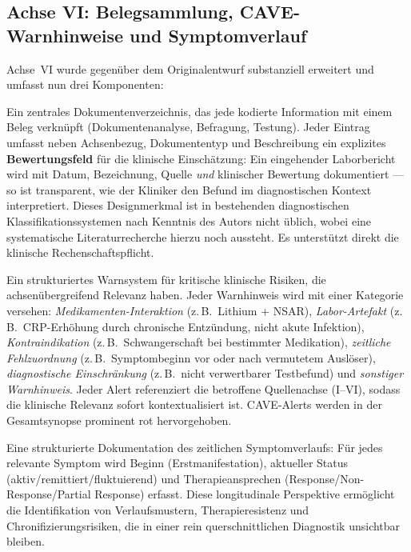 \documentclass[11pt,a4paper]{article}
\begin{document}
\subsection{Achse VI: Belegsammlung, CAVE-Warnhinweise und Symptomverlauf}

Achse~VI wurde gegen\"uber dem Originalentwurf substanziell erweitert und umfasst nun drei Komponenten:

\begin{description}[style=nextline, leftmargin=1.5cm, font=\bfseries]
\item[Evidenz-Matrix] Ein zentrales Dokumentenverzeichnis, das jede kodierte Information mit einem Beleg verkn\"upft (Dokumentenanalyse, Befragung, Testung). Jeder Eintrag umfasst neben Achsenbezug, Dokumententyp und Beschreibung ein explizites \textbf{Bewertungsfeld} f\"ur die klinische Einsch\"atzung: Ein eingehender Laborbericht wird mit Datum, Bezeichnung, Quelle \textit{und} klinischer Bewertung dokumentiert --- so ist transparent, wie der Kliniker den Befund im diagnostischen Kontext interpretiert. Dieses Designmerkmal ist in bestehenden diagnostischen Klassifikationssystemen nach Kenntnis des Autors nicht \"ublich, wobei eine systematische Literaturrecherche hierzu noch aussteht. Es unterst\"utzt direkt die klinische Rechenschaftspflicht.
\item[CAVE-Warnhinweise] Ein strukturiertes Warnsystem f\"ur kritische klinische Risiken, die achsen\"ubergreifend Relevanz haben. Jeder Warnhinweis wird mit einer Kategorie versehen: \textit{Medikamenten-Interaktion} (z.\,B.\ Lithium + NSAR), \textit{Labor-Artefakt} (z.\,B.\ CRP-Erh\"ohung durch chronische Entz\"undung, nicht akute Infektion), \textit{Kontraindikation} (z.\,B.\ Schwangerschaft bei bestimmter Medikation), \textit{zeitliche Fehlzuordnung} (z.\,B.\ Symptombeginn vor oder nach vermutetem Ausl\"oser), \textit{diagnostische Einschr\"ankung} (z.\,B.\ nicht verwertbarer Testbefund) und \textit{sonstiger Warnhinweis}. Jeder Alert referenziert die betroffene Quellenachse (I--VI), sodass die klinische Relevanz sofort kontextualisiert ist. CAVE-Alerts werden in der Gesamtsynopse prominent rot hervorgehoben.
\item[Longitudinaler Symptomverlauf] Eine strukturierte Dokumentation des zeitlichen Symptomverlaufs: F\"ur jedes relevante Symptom wird Beginn (Erstmanifestation), aktueller Status (aktiv/remittiert/fluktuierend) und Therapieansprechen (Response/Non-Response/Partial Response) erfasst. Diese longitudinale Perspektive erm\"oglicht die Identifikation von Verlaufsmustern, Therapieresistenz und Chronifizierungsrisiken, die in einer rein querschnittlichen Diagnostik unsichtbar bleiben.

\end{description}
\end{document}
